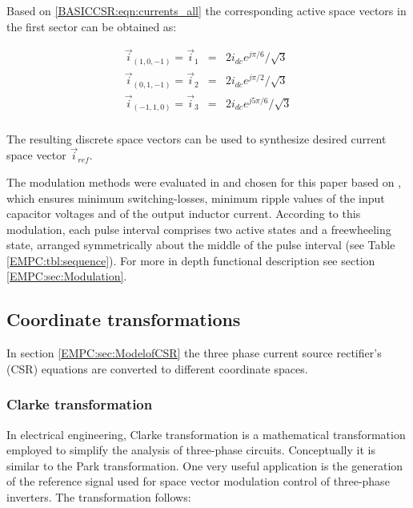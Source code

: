 		Based on \ref{BASICCSR:eqn:currents_all} the corresponding active space vectors in the first sector can be obtained as:
		
		\begin{equation}
        \begin{array}{rcl}
            \vec{i}_{(1,0,-1)}=\vec{i}_1&=&2i_{dc}e^{j\pi/6}/\sqrt{3}\\
						\vec{i}_{(0,1,-1)}=\vec{i}_2&=&2i_{dc}e^{j\pi/2}/\sqrt{3}\\
						\vec{i}_{(-1,1,0)}=\vec{i}_3&=&2i_{dc}e^{j5\pi/6}/\sqrt{3}\\
        \end{array}
        \label{BASICCSR:eqn:currents}
    \end{equation}
		
		The resulting discrete space vectors can be used to synthesize desired current
space vector $\vec{i}_{ref}$.

The modulation methods were evaluated in and chosen for this paper based on \cite{moussaoui2005open}, which ensures minimum switching-losses, minimum ripple values of the input capacitor voltages and of the output inductor current. According to this modulation, each pulse interval comprises two active states and a freewheeling state, arranged symmetrically about the middle of the pulse interval (see Table \ref{EMPC:tbl:sequence}). For more in depth functional description see section \ref{EMPC:sec:Modulation}.

\subsection{Coordinate transformations}

In section \ref{EMPC:sec:ModelofCSR} the three phase current source rectifier's (CSR) equations are converted to different coordinate spaces.

\subsubsection{Clarke transformation}\label{BASICCSR:sec:Clarke}

In electrical engineering, Clarke transformation is a mathematical transformation employed to simplify the analysis of three-phase circuits. Conceptually it is similar to the Park transformation. One very useful application is the generation of the reference signal used for space vector modulation control of three-phase inverters. The transformation follows:

